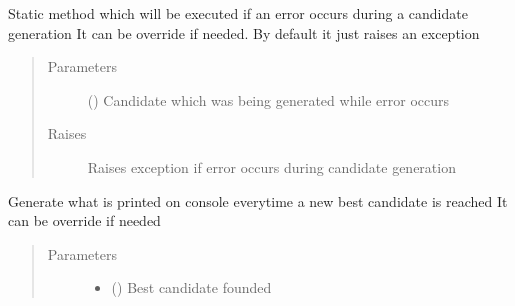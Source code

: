 \documentclass[letterpaper,10pt,english]{sphinxmanual}
\begin{document}
\begin{fulllineitems}
\begin{fulllineitems}
\label{\detokenize{genetic:genetic.Genetic.catch}}
\sphinxAtStartPar
Static method which will be executed if an error occurs during a candidate generation
It can be override if needed. By default it just raises an exception
\begin{quote}\begin{description}
\item[{Parameters}] \leavevmode
\sphinxAtStartPar
{} ({\hyperref[\detokenize{genetic:genetic.Chromosome}]{}}) \textendash{} Candidate which was being generated while error occurs

\item[{Raises}] \leavevmode
\sphinxAtStartPar
{} \textendash{} Raises exception if error occurs during candidate generation

\end{description}\end{quote}

\end{fulllineitems}


\begin{fulllineitems}
\label{\detokenize{genetic:genetic.Genetic.display}}
\sphinxAtStartPar
Generate what is printed on console everytime a new best candidate is reached
It can be override if needed
\begin{quote}\begin{description}
\item[{Parameters}] \leavevmode\begin{itemize}
\item {} 
\sphinxAtStartPar
{} ({\hyperref[\detokenize{genetic:genetic.Chromosome}]{}}) \textendash{} Best candidate founded


\end{itemize}
\end{description}
\end{quote}
\end{fulllineitems}
\end{fulllineitems}
\end{document}
